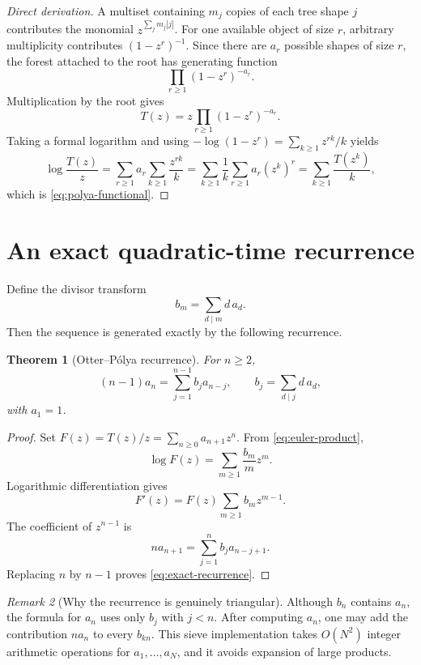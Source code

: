\documentclass[11pt,a4paper,oneside,openany]{book}
\newtheorem{theorem}{Theorem}[chapter]
\theoremstyle{definition}
\theoremstyle{remark}
\newtheorem{remark}[theorem]{Remark}
\begin{document}
\begin{proof}[Direct derivation]
A multiset containing $m_j$ copies of each tree shape $j$ contributes the monomial
$z^{\sum_jm_j|j|}$.  For one available object of size $r$, arbitrary multiplicity
contributes $(1-z^r)^{-1}$.  Since there are $a_r$ possible shapes of size $r$, the
forest attached to the root has generating function
\[
 \prod_{r\ge1}(1-z^r)^{-a_r}.
\]
Multiplication by the root gives
\begin{equation}
 T(z)=z\prod_{r\ge1}(1-z^r)^{-a_r}.
 \label{eq:euler-product}
\end{equation}
Taking a formal logarithm and using
$-\log(1-z^r)=\sum_{k\ge1}z^{rk}/k$ yields
\[
 \log\frac{T(z)}z
 =\sum_{r\ge1}a_r\sum_{k\ge1}\frac{z^{rk}}k
 =\sum_{k\ge1}\frac1k\sum_{r\ge1}a_r(z^k)^r
 =\sum_{k\ge1}\frac{T(z^k)}k,
\]
which is \cref{eq:polya-functional}.
\end{proof}

\section{An exact quadratic-time recurrence}
Define the divisor transform
\begin{equation}
 b_m=\sum_{d\mid m}d\,a_d.
 \label{eq:bdivisor}
\end{equation}
Then the sequence is generated exactly by the following recurrence.

\begin{theorem}[Otter--P\'olya recurrence]
\label{thm:exact-recurrence}
For $n\ge2$,
\begin{equation}
 \boxed{
 (n-1)a_n=\sum_{j=1}^{n-1}b_j a_{n-j},
 \qquad b_j=\sum_{d\mid j}d\,a_d,}
 \label{eq:exact-recurrence}
\end{equation}
with $a_1=1$.
\end{theorem}

\begin{proof}
Set $F(z)=T(z)/z=\sum_{n\ge0}a_{n+1}z^n$.  From
\cref{eq:euler-product},
\[
 \log F(z)=\sum_{m\ge1}\frac{b_m}{m}z^m.
\]
Logarithmic differentiation gives
\[
 F'(z)=F(z)\sum_{m\ge1}b_mz^{m-1}.
\]
The coefficient of $z^{n-1}$ is
\[
 n a_{n+1}=\sum_{j=1}^{n}b_j a_{n-j+1}.
\]
Replacing $n$ by $n-1$ proves \cref{eq:exact-recurrence}.
\end{proof}

\begin{remark}[Why the recurrence is genuinely triangular]
Although $b_n$ contains $a_n$, the formula for $a_n$ uses only $b_j$ with
$j<n$.  After computing $a_n$, one may add the contribution $n a_n$ to every
$b_{kn}$.  This sieve implementation takes $O(N^2)$ integer arithmetic operations
for $a_1,\ldots,a_N$, and it avoids expansion of large products.
\end{remark}
\end{document}
